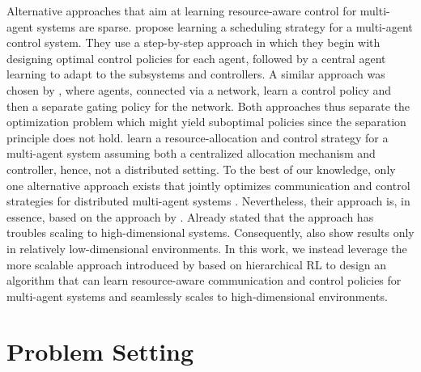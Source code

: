 \documentclass[12pt, final]{l4dc2023}
\begin{document}
Alternative approaches that aim at learning resource-aware control for multi-agent systems are sparse. \cite{Demirel.2018} propose learning a scheduling strategy for a multi-agent control system. 
They use a step-by-step approach in which they begin with designing optimal control policies for each agent, followed by a central agent learning to adapt to the subsystems and controllers. 
A similar approach was chosen by \cite{Hu.2021}, where agents, connected via a network, learn a control policy and then a separate gating policy for the network. 
Both approaches thus separate the optimization problem which might yield suboptimal policies since the separation principle does not hold.
\cite{lima2022model} learn a resource-allocation and control strategy for a multi-agent system assuming both a centralized allocation mechanism and controller, hence, not a distributed setting.
To the best of our knowledge, only one alternative approach exists that jointly optimizes communication and control strategies for distributed multi-agent systems \citep{Shibata.2021,shibata2022deep}. 
Nevertheless, their approach is, in essence, based on the approach by \cite{baumann2018deep}.
Already \cite{baumann2018deep} stated that the approach has troubles scaling to high-dimensional systems.
Consequently, also \cite{Shibata.2021,shibata2022deep} show results only in relatively low-dimensional environments.
In this work, we instead leverage the more scalable approach introduced by \cite{funk2021learning} based on hierarchical RL to design an algorithm that can learn resource-aware communication and control policies for multi-agent systems and seamlessly scales to high-dimensional environments.




\section{Problem Setting}
\end{document}
